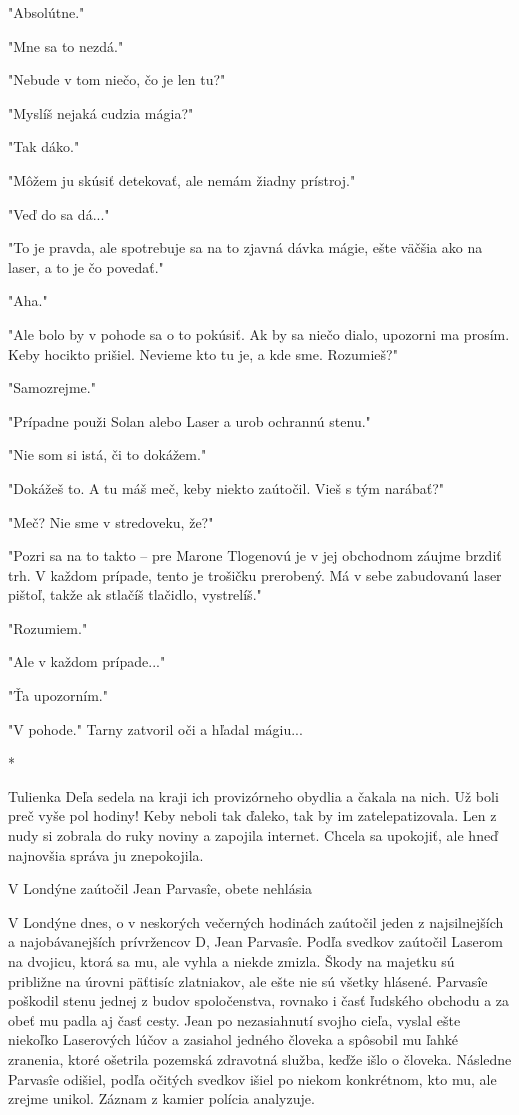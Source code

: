 \documentclass{book}
\begin{document}
"$ $Absolútne."$ $ 

"$ $Mne sa to nezdá."$ $ 

"$ $Nebude v tom niečo, čo je len tu?"$ $ 

"$ $Myslíš nejaká cudzia mágia?"$ $ 

"$ $Tak dáko."$ $ 

"$ $Môžem ju skúsiť detekovať, ale nemám žiadny prístroj."$ $ 

"$ $Veď do sa dá..."$ $ 

"$ $To je pravda, ale spotrebuje sa na to zjavná dávka mágie, ešte väčšia ako na laser, a to je čo povedať."$ $ 

"$ $Aha."$ $ 

"$ $Ale bolo by v pohode sa o to pokúsiť. Ak by sa niečo dialo, upozorni ma prosím. Keby hocikto prišiel. Nevieme kto tu je, a kde sme. Rozumieš?"$ $ 

"$ $Samozrejme."$ $ 

"$ $Prípadne použi Solan alebo Laser a urob ochrannú stenu."$ $ 

"$ $Nie som si istá, či to dokážem."$ $ 

"$ $Dokážeš to. A tu máš meč, keby niekto zaútočil. Vieš s tým narábať?"$ $ 

"$ $Meč? Nie sme v stredoveku, že?"$ $ 

"$ $Pozri sa na to takto – pre Marone Tlogenovú je v jej obchodnom záujme brzdiť trh. V každom prípade, tento je trošičku prerobený. Má v sebe zabudovanú laser pištoľ, takže ak stlačíš tlačidlo, vystrelíš."$ $ 

"$ $Rozumiem."$ $ 

"$ $Ale v každom prípade..."$ $ 

"$ $Ťa upozorním."$ $ 

"$ $V pohode."$ $  Tarny zatvoril oči a hľadal mágiu...

\begin{center}

*

\end{center}

Tulienka Deľa sedela na kraji ich provizórneho obydlia a čakala na nich. Už boli preč vyše pol hodiny! Keby neboli tak ďaleko, tak by im zatelepatizovala. Len z nudy si zobrala do ruky noviny a zapojila internet. Chcela sa upokojiť, ale hneď najnovšia správa ju znepokojila.

V Londýne zaútočil Jean Parvasîe, obete nehlásia

V Londýne dnes, o v neskorých večerných hodinách zaútočil jeden z najsilnejších a najobávanejších prívržencov D, Jean Parvasîe. Podľa svedkov zaútočil Laserom na dvojicu, ktorá sa mu, ale vyhla a niekde zmizla. Škody na majetku sú približne na úrovni päťtisíc zlatniakov, ale ešte nie sú všetky hlásené. Parvasîe poškodil stenu jednej z budov spoločenstva, rovnako i časť ľudského obchodu a za obeť mu padla aj časť cesty. Jean po nezasiahnutí svojho cieľa, vyslal ešte niekoľko Laserových lúčov a zasiahol jedného človeka a spôsobil mu ľahké zranenia, ktoré ošetrila pozemská zdravotná služba, keďže išlo o človeka. Následne Parvasîe odišiel, podľa očitých svedkov išiel po niekom konkrétnom, kto mu, ale zrejme unikol. Záznam z kamier polícia analyzuje.
\end{document}

